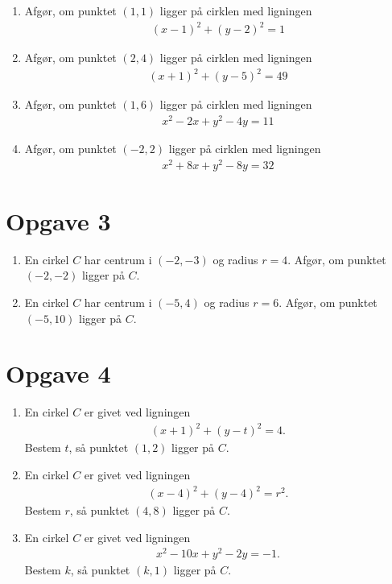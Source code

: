\begin{enumerate}[label=\roman*)]
	\item Afgør, om punktet $(1,1)$ ligger på cirklen med ligningen
	\begin{align*}
		(x-1)^2 +(y-2)^2 = 1 
	\end{align*}
	\item Afgør, om punktet $(2,4)$ ligger på cirklen med ligningen
	\begin{align*}
		(x+1)^2 + (y-5)^2 = 49
	\end{align*}
	\item Afgør, om punktet $(1,6)$ ligger på cirklen med ligningen 
	\begin{align*}
		x^2-2x+y^2-4y=11
	\end{align*}
	\item Afgør, om punktet $(-2,2)$ ligger på cirklen med ligningen
	\begin{align*}
		x^2+8x+y^2-8y=32
	\end{align*}
\end{enumerate}

\section*{Opgave 3}
\begin{enumerate}[label=\roman*)]
	\item En cirkel $C$ har centrum i $(-2,-3)$ og radius $r=4$. Afgør, om punktet $(-2,-2)$ 
	ligger på $C$.
	\item En cirkel $C$ har centrum i $(-5,4)$ og radius $r=6$. Afgør, om punktet $(-5,10)$ 
	ligger på $C$.
\end{enumerate}

\section*{Opgave 4}
\begin{enumerate}[label=\roman*)]
	\item En cirkel $C$ er givet ved ligningen
	\begin{align*}
		(x+1)^2+(y-t)^2 = 4.
	\end{align*}
	Bestem $t$, så punktet $(1,2)$ ligger på $C$.
	\item En cirkel $C$ er givet ved ligningen
	\begin{align*}
		(x-4)^2 + (y-4)^2 = r^2.
	\end{align*}
	Bestem $r$, så punktet $(4,8)$ ligger på $C$.
	\item En cirkel $C$ er givet ved ligningen
	\begin{align*}
		x^2-10x+y^2-2y=-1.
	\end{align*}
	Bestem $k$, så punktet $(k,1)$ ligger på $C$.
\end{enumerate}